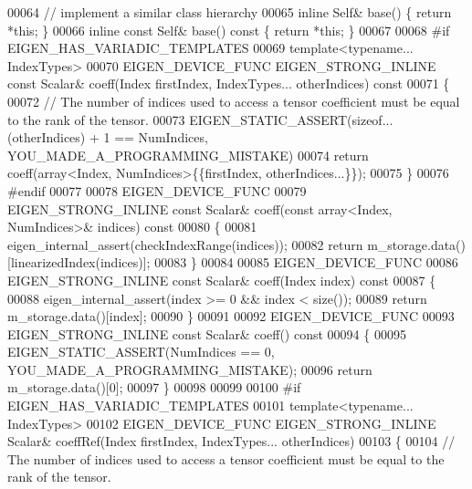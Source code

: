 \begin{DoxyCode}
00064     \textcolor{comment}{// implement a similar class hierarchy}
00065     \textcolor{keyword}{inline} Self& base()             \{ \textcolor{keywordflow}{return} *\textcolor{keyword}{this}; \}
00066     \textcolor{keyword}{inline} \textcolor{keyword}{const} Self& base()\textcolor{keyword}{ const }\{ \textcolor{keywordflow}{return} *\textcolor{keyword}{this}; \}
00067 
00068 \textcolor{preprocessor}{#if EIGEN\_HAS\_VARIADIC\_TEMPLATES}
00069     \textcolor{keyword}{template}<\textcolor{keyword}{typename}... IndexTypes>
00070     EIGEN\_DEVICE\_FUNC EIGEN\_STRONG\_INLINE \textcolor{keyword}{const} Scalar& coeff(Index firstIndex, IndexTypes... otherIndices)\textcolor{keyword}{
       const}
00071 \textcolor{keyword}{    }\{
00072       \textcolor{comment}{// The number of indices used to access a tensor coefficient must be equal to the rank of the tensor.}
00073       EIGEN\_STATIC\_ASSERT(\textcolor{keyword}{sizeof}...(otherIndices) + 1 == NumIndices, YOU\_MADE\_A\_PROGRAMMING\_MISTAKE)
00074       \textcolor{keywordflow}{return} coeff(array<Index, NumIndices>\{\{firstIndex, otherIndices...\}\});
00075     \}
00076 \textcolor{preprocessor}{#endif}
00077 
00078     EIGEN\_DEVICE\_FUNC
00079     EIGEN\_STRONG\_INLINE \textcolor{keyword}{const} Scalar& coeff(\textcolor{keyword}{const} array<Index, NumIndices>& indices)\textcolor{keyword}{ const}
00080 \textcolor{keyword}{    }\{
00081       eigen\_internal\_assert(checkIndexRange(indices));
00082       \textcolor{keywordflow}{return} m\_storage.data()[linearizedIndex(indices)];
00083     \}
00084 
00085     EIGEN\_DEVICE\_FUNC
00086     EIGEN\_STRONG\_INLINE \textcolor{keyword}{const} Scalar& coeff(Index index)\textcolor{keyword}{ const}
00087 \textcolor{keyword}{    }\{
00088       eigen\_internal\_assert(index >= 0 && index < size());
00089       \textcolor{keywordflow}{return} m\_storage.data()[index];
00090     \}
00091 
00092     EIGEN\_DEVICE\_FUNC
00093     EIGEN\_STRONG\_INLINE \textcolor{keyword}{const} Scalar& coeff()\textcolor{keyword}{ const}
00094 \textcolor{keyword}{    }\{
00095       EIGEN\_STATIC\_ASSERT(NumIndices == 0, YOU\_MADE\_A\_PROGRAMMING\_MISTAKE);
00096       \textcolor{keywordflow}{return} m\_storage.data()[0];
00097     \}
00098 
00099 
00100 \textcolor{preprocessor}{#if EIGEN\_HAS\_VARIADIC\_TEMPLATES}
00101     \textcolor{keyword}{template}<\textcolor{keyword}{typename}... IndexTypes>
00102     EIGEN\_DEVICE\_FUNC EIGEN\_STRONG\_INLINE Scalar& coeffRef(Index firstIndex, IndexTypes... otherIndices)
00103     \{
00104       \textcolor{comment}{// The number of indices used to access a tensor coefficient must be equal to the rank of the tensor.}

\end{DoxyCode}
